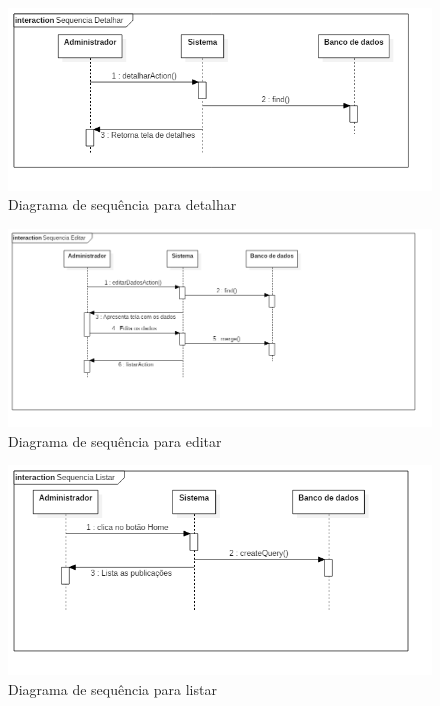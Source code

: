\begin{figure}[H]
    \centering
    \includegraphics[width=\textwidth]{figuras/sequenciaDetalhar}
    \caption{Diagrama de sequência para detalhar}
\end{figure}

\begin{figure}[H]
    \centering
    \includegraphics[width=\textwidth]{figuras/sequenciaEditar}
    \caption{Diagrama de sequência para editar}
\end{figure}

\begin{figure}[H]
    \centering
    \includegraphics[width=\textwidth]{figuras/sequenciaListar}
    \caption{Diagrama de sequência para listar}
\end{figure}